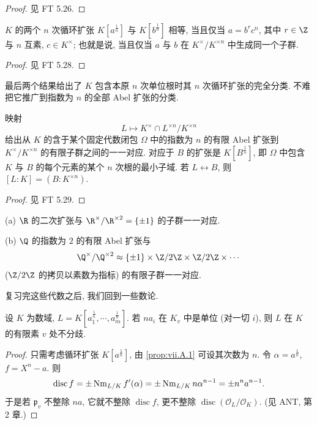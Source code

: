 \begin{proof}
见 FT 5.26.
\end{proof}

\begin{proposition}\label{prop:vii.A.2}
$K$ 的两个 $n$ 次循环扩张 $K[a^{\frac{1}{n}}]$ 与 $K[b^{\frac{1}{n}}]$ 相等, 当且仅当 $a=b^{r}c^{n}$, 其中 $r\in\Z$ 与 $n$ 互素, $c\in K^{\times}$; 也就是说, 当且仅当 $a$ 与 $b$ 在 $K^{\times}/K^{\times n}$ 中生成同一个子群.
\end{proposition}

\begin{proof}
见 FT 5.28.
\end{proof}

最后两个结果给出了 $K$ 包含本原 $n$ 次单位根时其 $n$ 次循环扩张的完全分类. 不难把它推广到指数为 $n$ 的全部 Abel 扩张的分类.

\begin{theorem}\label{thm:vii.A.3}
映射
\[
L\mapsto K^{\times}\cap L^{\times n}/K^{\times n}
\]
给出从 $K$ 的含于某个固定代数闭包 $\Omega$ 中的指数为 $n$ 的有限 Abel 扩张到 $K^{\times}/K^{\times n}$ 的有限子群之间的一一对应. 对应于 $B$ 的扩张是 $K[B^{\frac{1}{n}}]$, 即 $\Omega$ 中包含 $K$ 与 $B$ 的每个元素的某个 $n$ 次根的最小子域. 若 $L\leftrightarrow B$, 则 $[L:K]=(B:K^{\times n})$.
\end{theorem}

\begin{proof}
见 FT 5.29.
\end{proof}

\begin{example}\label{ex:vii.A.4}
(a) $\R$ 的二次扩张与 $\R^{\times}/\R^{\times 2}=\{\pm1\}$ 的子群一一对应.

(b) $\Q$ 的指数为 $2$ 的有限 Abel 扩张与
\[
\Q^{\times}/\Q^{\times 2}\approx\{\pm1\}\times\Z/2\Z\times\Z/2\Z\times\cdots
\]
($\Z/2\Z$ 的拷贝以素数为指标) 的有限子群一一对应.
\end{example}

复习完这些代数之后, 我们回到一些数论.

\begin{proposition}\label{prop:vii.A.5}
设 $K$ 为数域, $L=K[a_{1}^{\frac{1}{n}},\cdots,a_{m}^{\frac{1}{n}}]$. 若 $na_i$ 在 $K_v$ 中是单位 (对一切 $i$), 则 $L$ 在 $K$ 的有限素 $v$ 处不分歧.
\end{proposition}

\begin{proof}
只需考虑循环扩张 $K[a^{\frac{1}{n}}]$, 由 \ref{prop:vii.A.1} 可设其次数为 $n$. 令 $\alpha=a^{\frac{1}{n}}$, $f=X^{n}-a$. 则
\[
\operatorname{disc}f=\pm\operatorname{Nm}_{L/K}f'(\alpha)=\pm\operatorname{Nm}_{L/K}n\alpha^{n-1}=\pm n^{n}a^{n-1}.
\]
于是若 $\mathfrak{p}_v$ 不整除 $na$, 它就不整除 $\operatorname{disc}f$, 更不整除 $\operatorname{disc}(\mathcal{O}_L/\mathcal{O}_K)$. (见 ANT, 第 2 章.)
\end{proof}

